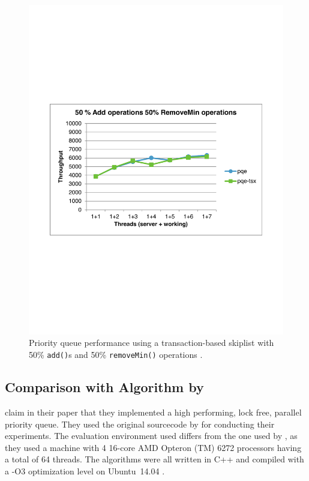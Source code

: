 \begin{figure}[htb]
\begin{minipage}{.495\textwidth}
		\includegraphics[width=\linewidth]{graphics/tsx-50-50.pdf}
		\caption{Priority queue performance using a transaction-based skiplist with 50\% \texttt{add()}s and 50\% \texttt{removeMin()} operations \cite{calciu_adaptive_2014}.}
		\label{fig:tsx2}
	\end{minipage}
\end{figure}

\subsection{Comparison with Algorithm by \citeauthor{braginsky_cbpq:_2016}}

\citeauthor{braginsky_cbpq:_2016} claim in their paper that they implemented a high performing, lock free, parallel priority queue. They used the original sourcecode by \citeauthor{calciu_adaptive_2014} for conducting their experiments. The evaluation environment used differs from the one used by \citeauthor{calciu_adaptive_2014}, as they used a machine with 4 16-core AMD Opteron (TM) 6272 processors having a total of 64 threads. The algorithms were all written in C++ and compiled with a -O3 optimization level on Ubuntu~14.04 \cite{braginsky_cbpq:_2016}.

